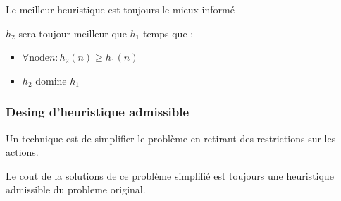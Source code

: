 			Le meilleur heuristique est toujours le mieux informé
			
			$h_2$ sera toujour meilleur que $h_1$ temps que  :
			\begin{itemize}
				\item $\forall \text{node} n : h_2(n) \geq h_1(n)$
				\item $h_2$ domine $h_1$
			\end{itemize}
			
		\subsubsection{Desing d'heuristique admissible}
			Un technique est de simplifier le problème en retirant des restrictions sur les actions.
			
			Le cout de la solutions de ce problème simplifié est toujours une heuristique admissible du probleme original.